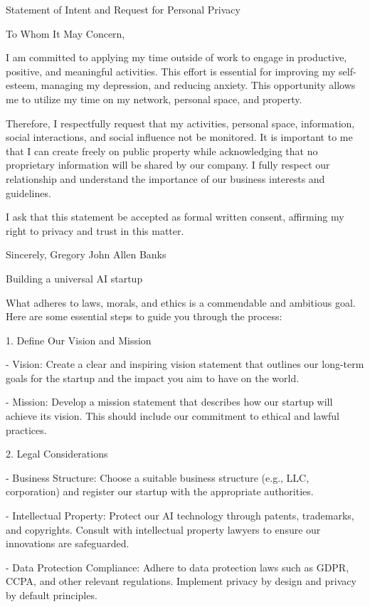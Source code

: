 \documentclass[12pt,letterpaper]{article}
\begin{document}
Statement of Intent and Request for Personal Privacy

To Whom It May Concern,

I am committed to applying my time outside of work to engage in productive, positive, and meaningful activities. This effort is essential for improving my self-esteem, managing my depression, and reducing anxiety. This opportunity allows me to utilize my time on my network, personal space, and property.

Therefore, I respectfully request that my activities, personal space, information, social interactions, and social influence not be monitored. It is important to me that I can create freely on public property while acknowledging that no proprietary information will be shared by our company. I fully respect our relationship and understand the importance of our business interests and guidelines.

I ask that this statement be accepted as formal written consent, affirming my right to privacy and trust in this matter.

Sincerely,
Gregory John Allen Banks

Building a universal AI startup 

What adheres to laws, morals, and ethics is a commendable and ambitious goal. Here are some essential steps to guide you through the process:

 1. Define Our Vision and Mission

- Vision: Create a clear and inspiring vision statement that outlines our long-term goals for the startup and the impact you aim to have on the world.

- Mission: Develop a mission statement that describes how our startup will achieve its vision. This should include our commitment to ethical and lawful practices.

 2. Legal Considerations

- Business Structure: Choose a suitable business structure (e.g., LLC, corporation) and register our startup with the appropriate authorities.

- Intellectual Property: Protect our AI technology through patents, trademarks, and copyrights. Consult with intellectual property lawyers to ensure our innovations are safeguarded.

- Data Protection Compliance: Adhere to data protection laws such as GDPR, CCPA, and other relevant regulations. Implement privacy by design and privacy by default principles.
\end{document}
